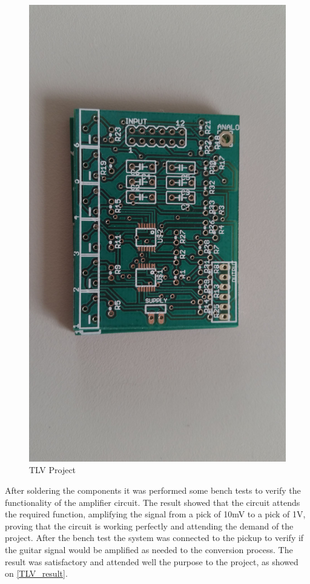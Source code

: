 \begin{figure}[!htpb]
\centering
\caption{TLV Project}
\label{TLV_board}
\includegraphics[scale=0.08]{images/TLV_board}
\end{figure}

After soldering the components it was performed some bench tests to
verify the functionality of the amplifier circuit. The result showed that the
circuit attends the required function, amplifying the signal from a pick of 10mV
to a pick of 1V, proving that the circuit is working perfectly and attending the
demand of the project. After the bench test the system was connected to the pickup
to verify if the guitar signal would be amplified as needed to the conversion process.
The result was satisfactory and attended well the purpose to the project, as showed on \autoref{TLV_result}.

